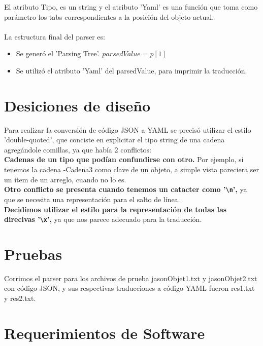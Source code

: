 \documentclass{article}
\begin{document}
El atributo Tipo, es un string y el atributo 'Yaml' es una función que toma como parámetro los tabs correspondientes a la posición del objeto actual.
\\ \\
La estructura final del parser es:
\begin{itemize}
    \item Se generó el 'Parsing Tree'. $parsedValue = p[1]$
    \item Se utilizó el atributo 'Yaml' del parsedValue, para imprimir la traducción. \\ %
\end{itemize}

\section{Desiciones de diseño}
Para realizar la conversión de código JSON a YAML se precisó utilizar el estilo 'double-quoted', que conciste en explicitar el tipo string de una cadena agregándole comillas, ya que había 2 conflictos: \\
\textbf{Cadenas de un tipo que podían confundirse con otro.} Por ejemplo, si tenemos la cadena -Cadena3 como clave de un objeto, a simple vista pareciera ser un item de un arreglo, cuando no lo es. \\
\textbf{Otro conflicto se presenta cuando tenemos un catacter como '\texttt{\textbackslash n}',} ya que se necesita una representación para el salto de línea. \\
\textbf{Decidimos utilizar el estilo para la representación de todas las direcivas '\texttt{\textbackslash x}',} ya que nos parece adecuado para la traducción.


\section{Pruebas}

Corrimos el parser para los archivos de prueba jasonObjet1.txt y jasonObjet2.txt con código JSON, y sus respectivas traducciones a código YAML fueron res1.txt y res2.txt.

\section{Requerimientos de Software}
\end{document}
